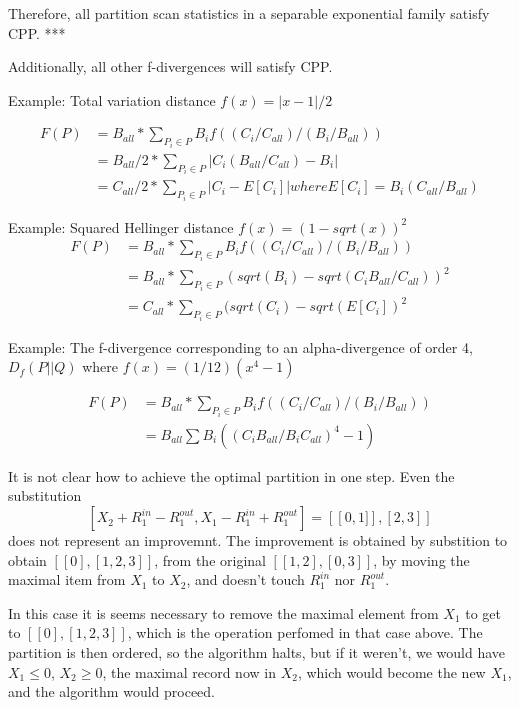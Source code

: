 \documentclass{article}
\theoremstyle{case}
\begin{document}
Therefore, all partition scan statistics in a separable exponential family satisfy CPP. ***

Additionally, all other f-divergences will satisfy CPP.

Example: Total variation distance $f(x) = |x-1|/2$

\begin{align*}
F(P) &= B_{all} * \sum_{P_i \in P} B_i f((C_i/C_{all})/(B_i/B_{all})) \\
&= B_{all}/2 * \sum_{P_i \in P} |C_i(B_{all}/C_{all}) - B_i| \\
&= C_{all}/2 * \sum_{P_i \in P} |C_i - E[C_i]| where E[C_i] = B_i (C_{all}/B_{all})
\end{align*}


Example: Squared Hellinger distance $f(x) = (1-sqrt(x))^2$
\begin{align*}
F(P) &= B_{all} * \sum_{P_i \in P} B_i f((C_i/C_{all})/(B_i/B_{all})) \\
&= B_{all} * \sum_{P_i \in P} (sqrt(B_i)-sqrt(C_iB_{all}/C_{all}))^2 \\
& =C_{all} * \sum_{P_i \in P} (sqrt(C_i) - sqrt(E[C_i])^2
\end{align*}

Example: The f-divergence corresponding to an alpha-divergence of order 4,
$D_f(P || Q)$ where $f(x) = (1/12)(x^4 - 1)$

\begin{align*}
F(P) &= B_{all} * \sum_{P_i \in P} B_i f((C_i/C_{all})/(B_i/B_{all})) \\
&= B_{all} \sum B_i ((C_iB_{all} / B_iC_{all})^4 - 1)
\end{align*}


It is not clear how to achieve the optimal partition in one step. Even the substitution
\[
\left[ X_2 + R_1^{in} - R_1^{out}, X_1 - R_1^{in}+R_1^{out} \right] = \left[ \left[0,1] \right], \left[ 2, 3\right] \right]
\]
does not represent an improvemnt. The improvement is obtained by substition to obtain $\left[ \left[ 0 \right], \left[ 1, 2, 3\right]\right]$, from the original $\left[ \left[ 1, 2\right], \left[ 0, 3\right] \right]$, by moving the maximal item from $X_1$ to $X_2$, and doesn't touch $R_1^{in}$ nor $R_1^{out}$.

In this case it is seems necessary to remove the maximal element from $X_1$ to get to $\left[ \left[ 0 \right], \left[ 1, 2, 3\right]\right]$, which is the operation perfomed in that case above. The partition is then ordered, so the algorithm halts, but if it weren't, we would have $X_1 \leq 0$, $X_2 \geq 0$, the maximal record now in $X_2$, which would become the new $X_1$, and the algorithm would proceed. 
\end{document}

